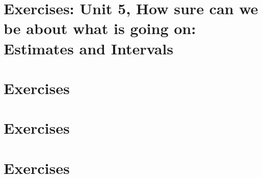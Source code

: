 \documentclass[letterpaper,10pt,english]{jupyterBook}
\begin{document}
\chapter{Exercises: Unit 5, How sure can we be about what is going on: Estimates and Intervals}
\label{\detokenize{exercises_unit_5:exercises-unit-5-how-sure-can-we-be-about-what-is-going-on-estimates-and-intervals}}\label{\detokenize{exercises_unit_5::doc}}
\sphinxstepscope


\chapter{Exercises}
\label{\detokenize{exercises_unit_6:exercises}}\label{\detokenize{exercises_unit_6::doc}}
\sphinxstepscope


\chapter{Exercises}
\label{\detokenize{exercises_unit_7:exercises}}\label{\detokenize{exercises_unit_7::doc}}
\sphinxstepscope


\chapter{Exercises}
\label{\detokenize{exercises_unit_8:exercises}}\label{\detokenize{exercises_unit_8::doc}}






\renewcommand{\indexname}{Index}
\printindex
\end{document}
